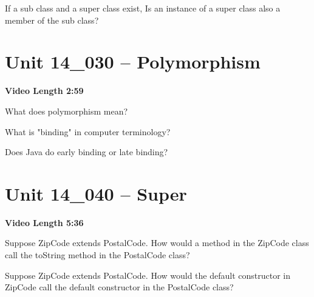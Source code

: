\documentclass[letterpaper,12pt]{exam}
\newcommand{\unit}{Unit 14}
\begin{document}
\begin{questions}
\begin{samepage}
    \question If a sub class and a super class exist, Is an instance of a super class also a member of the sub class?
    \vspace{5mm}
\end{samepage}


\section*{\unit\_030 -- Polymorphism} 
\par{\selectfont\textbf{Video Length 2:59}}

\begin{samepage}
    \question What does polymorphism mean?
    \vspace{5mm}
\end{samepage}

\begin{samepage}
    \question What is "binding" in computer terminology?
    \vspace{5mm}
\end{samepage}

\begin{samepage}
    \question Does Java do early binding or late binding?
    \vspace{5mm}
\end{samepage}


\section*{\unit\_040 -- Super} 
\par{\selectfont\textbf{Video Length 5:36}}

\begin{samepage}
    \question Suppose ZipCode extends PostalCode.  How would a method in the ZipCode class call the toString method in the PostalCode class?
    \vspace{5mm}
\end{samepage}

\begin{samepage}
    \question Suppose ZipCode extends PostalCode.  How would the default constructor in ZipCode call the default constructor in the PostalCode class?
    \vspace{5mm}
\end{samepage}


\end{questions}
\end{document}
